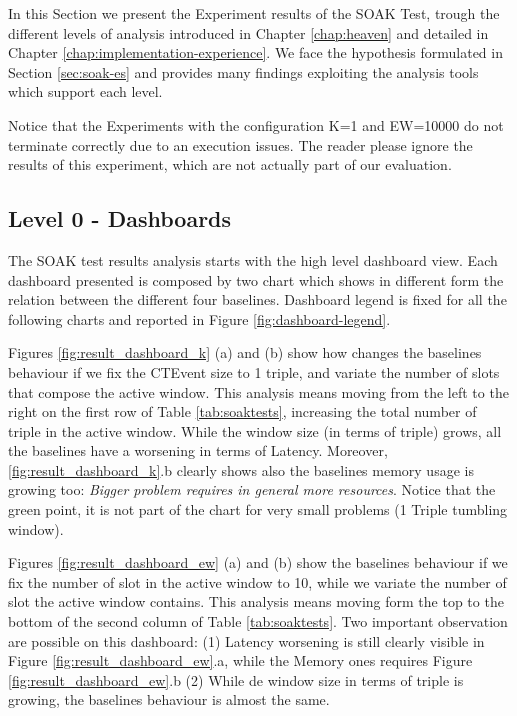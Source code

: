 In this Section we present the Experiment results of the SOAK Test, trough the different levels of analysis introduced in Chapter \ref{chap:heaven} and detailed in Chapter \ref{chap:implementation-experience}. We face the hypothesis formulated in Section \ref{sec:soak-es} and provides many findings exploiting the analysis tools which support each level.

Notice that the Experiments with the configuration K=1 and EW=10000 do not terminate correctly due to an execution issues. The reader please ignore the results of this experiment, which are not actually part of our evaluation.

\subsection{Level 0 - Dashboards}

The SOAK test results analysis starts with the high level dashboard view. Each dashboard presented is composed by two chart which shows in different form the relation between the different four baselines. Dashboard legend is fixed for all the following charts and reported in Figure \ref{fig:dashboard-legend}.

Figures \ref{fig:result_dashboard_k} (a) and (b) show how changes the baselines behaviour if we fix the CTEvent size to 1 triple, and variate the number of slots that compose the active window. This analysis means moving from the left to the right on the first row of Table \ref{tab:soaktests}, increasing the total number of triple in the active window. While the window size (in terms of triple) grows, all the baselines have a worsening in terms of Latency. Moreover,  \ref{fig:result_dashboard_k}.b clearly shows also the baselines memory usage is growing too: \textit{Bigger problem requires in general more resources}. Notice that the green point, it is not part of the chart for very small problems (1 Triple tumbling window).

Figures \ref{fig:result_dashboard_ew} (a) and (b) show the baselines behaviour if we fix the number of slot in the active window to 10, while we variate the number of slot the active window contains. This analysis means moving form the top to the bottom of the second column of Table \ref{tab:soaktests}. Two important observation are possible on this dashboard: (1) Latency worsening is still clearly visible in  Figure \ref{fig:result_dashboard_ew}.a, while the Memory ones requires Figure \ref{fig:result_dashboard_ew}.b (2) While de window size in terms of triple is growing, the baselines behaviour is almost the same. 

